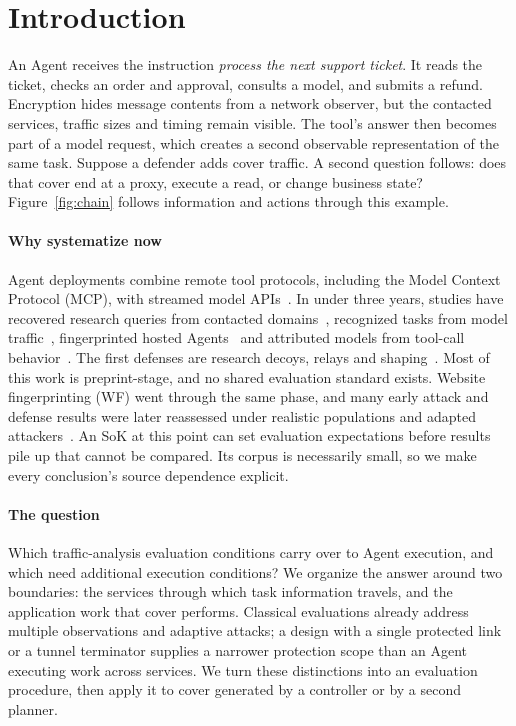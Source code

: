 \section{Introduction}
An Agent receives the instruction \emph{process the next support ticket}. It reads the ticket, checks an order and approval, consults a model, and submits a refund. Encryption hides message contents from a network observer, but the contacted services, traffic sizes and timing remain visible. The tool's answer then becomes part of a model request, which creates a second observable representation of the same task. Suppose a defender adds cover traffic. A second question follows: does that cover end at a proxy, execute a read, or change business state? Figure~\ref{fig:chain} follows information and actions through this example.



\paragraph{Why systematize now}
Agent deployments combine remote tool protocols, including the Model Context Protocol (MCP), with streamed model APIs~\cite{mcp2025transports,rfc9113}. In under three years, studies have recovered research queries from contacted domains~\cite{jeong2026wra}, recognized tasks from model traffic~\cite{li2026ant,pouryousef2026traffic}, fingerprinted hosted Agents~\cite{agentprint2025} and attributed models from tool-call behavior~\cite{zhao2026agenttrace,ediga2026trace}. The first defenses are research decoys, relays and shaping~\cite{jeong2026wra,dangol2026workflow}. Most of this work is preprint-stage, and no shared evaluation standard exists. Website fingerprinting (WF) went through the same phase, and many early attack and defense results were later reassessed under realistic populations and adapted attackers~\cite{dyer2012peekaboo,juarez2014critical,mathews2023critical}. An SoK at this point can set evaluation expectations before results pile up that cannot be compared. Its corpus is necessarily small, so we make every conclusion's source dependence explicit.

\paragraph{The question}
Which traffic-analysis evaluation conditions carry over to Agent execution, and which need additional execution conditions? We organize the answer around two boundaries: the services through which task information travels, and the application work that cover performs. Classical evaluations already address multiple observations and adaptive attacks; a design with a single protected link or a tunnel terminator supplies a narrower protection scope than an Agent executing work across services. We turn these distinctions into an evaluation procedure, then apply it to cover generated by a controller or by a second planner.

